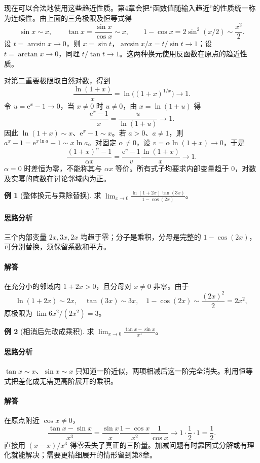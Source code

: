 \documentclass[UTF8,fontset=fandol,12pt,oneside,openany]{ctexrep}
\newcommand{\ee}{\mathrm e}
\theoremstyle{definition}
\newtheorem{example}{例}[chapter]
\begin{document}
现在可以合法地使用这些趋近性质。第4章会把“函数值随输入趋近”的性质统一称为连续性。由上面的三角极限及恒等式得
\[
\sin x\sim x,\qquad \tan x=\frac{\sin x}{\cos x}\sim x,
\qquad 1-\cos x=2\sin^2(x/2)\sim\frac{x^2}{2}.
\]
设 $t=\arcsin x\to0$，则 $x=\sin t$，$\arcsin x/x=t/\sin t\to1$；设 $t=\arctan x\to0$，同理 $t/\tan t\to1$。这两种换元使用反函数在原点的趋近性质。

对第二重要极限取自然对数，得到
\[
\frac{\ln(1+x)}x=\ln\bigl((1+x)^{1/x}\bigr)\longrightarrow1.
\]
令 $u=\ee^x-1\to0$，当 $x\ne0$ 时 $u\ne0$，由 $x=\ln(1+u)$ 得
\[
\frac{\ee^x-1}x=\frac u{\ln(1+u)}\longrightarrow1.
\]
因此 $\ln(1+x)\sim x$、$\ee^x-1\sim x$。若 $a>0$、$a\ne1$，则 $a^x-1=\ee^{x\ln a}-1\sim x\ln a$。对固定 $\alpha\ne0$，设 $v=\alpha\ln(1+x)\to0$，于是
\[
\frac{(1+x)^\alpha-1}{\alpha x}
=\frac{\ee^v-1}v\frac{\ln(1+x)}x\longrightarrow1.
\]
$\alpha=0$ 时差恒为零，不能称其与 $\alpha x$ 等价。所有式子均要求内部变量趋于 $0$，对数及实幂的底数在讨论邻域内为正。

\begin{example}[整体换元与乘除替换]
求 $\displaystyle\lim_{x\to0}\frac{\ln(1+2x)\tan(3x)}{1-\cos(2x)}$。
\end{example}
\paragraph{思路分析}三个内部变量 $2x,3x,2x$ 均趋于零；分子是乘积，分母是完整的 $1-\cos(2x)$，可分别替换，须保留系数和平方。
\paragraph{解答}在充分小的邻域内 $1+2x>0$，且分母对 $x\ne0$ 非零。由于
\[
\ln(1+2x)\sim2x,\quad \tan(3x)\sim3x,
\quad 1-\cos(2x)\sim\frac{(2x)^2}{2}=2x^2,
\]
原极限为 $\lim 6x^2/(2x^2)=3$。

\begin{example}[相消后先改成乘积]
求 $\displaystyle\lim_{x\to0}\frac{\tan x-\sin x}{x^3}$。
\end{example}
\paragraph{思路分析}$\tan x\sim x$、$\sin x\sim x$ 只知道一阶近似，两项相减后这一阶完全消失。利用恒等式把差化成无需更高阶展开的乘积。
\paragraph{解答}在原点附近 $\cos x\ne0$，
\[
\frac{\tan x-\sin x}{x^3}
=\frac{\sin x}{x}\frac{1-\cos x}{x^2}\frac1{\cos x}
\longrightarrow1\cdot\frac12\cdot1=\frac12.
\]
直接用 $(x-x)/x^3$ 得零丢失了真正的三阶量。加减问题有时靠因式分解或有理化就能解决；需要更精细展开的情形留到第8章。
\end{document}
